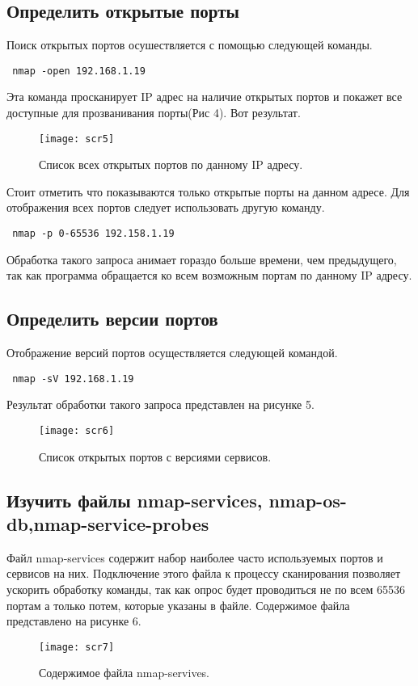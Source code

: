 \documentclass{article}
\begin{document}
 \subsection{Определить открытые порты}
 Поиск открытых портов осушествляется с помощью следующей команды.
 \begin{verbatim}
 nmap -open 192.168.1.19
 \end{verbatim}
 Эта команда просканирует IP адрес на наличие открытых портов и покажет все доступные для прозванивания порты(Рис 4). Вот результат.
 \begin{figure}[h!]
 	\centering
 	\texttt{[image: scr5]}
 	\caption{Список всех открытых портов по данному IP  адресу.}
 \end{figure}
 
 Стоит отметить что показываются только открытые порты на данном адресе. Для отображения всех портов следует использовать другую команду.
 \begin{verbatim}
 nmap -p 0-65536 192.158.1.19
 \end{verbatim}
 Обработка такого запроса анимает гораздо больше времени, чем предыдущего, так как программа обращается ко всем возможным портам по данному IP адресу.
 \clearpage
 
 \subsection{Определить версии портов}
 Отображение версий портов осуществляется следующей командой.
 \begin{verbatim}
 nmap -sV 192.168.1.19
 \end{verbatim}
 Результат обработки такого запроса представлен на рисунке 5.
 \begin{figure}[h!]
 	\centering
 	\texttt{[image: scr6]}
 	\caption{Список открытых портов с версиями сервисов.}
 \end{figure}
 \clearpage
 \subsection{Изучить файлы nmap-services, nmap-os-db,nmap-service-probes}
 Файл nmap-services содержит набор наиболее часто используемых портов и сервисов на них. Подключение этого файла к процессу сканирования позволяет ускорить обработку команды, так как опрос будет проводиться не по всем 65536 портам а только потем, которые указаны в файле. Содержимое файла представлено на рисунке 6.
 
 \begin{figure}[h!]
 	\centering
 	\texttt{[image: scr7]}
 	\caption{Содержимое файла nmap-servives.}
 \end{figure}
 
\end{document}
